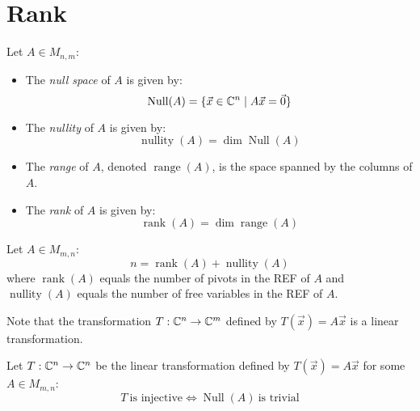 \documentclass[letterpaper,12pt,fleqn]{article}
\newcommand{\vx}{\vec{x}}
\newcommand{\vz}{\vec{0}}
\DeclareMathOperator{\Null}{Null}
\DeclareMathOperator{\nullity}{nullity}
\DeclareMathOperator{\range}{range}
\DeclareMathOperator{\rnk}{rank}
\begin{document}
\section*{Rank}

\begin{definition}
  Let $A\in M_{n,m}$:
  \begin{itemize}
  \item The \emph{null space} of $A$ is given by:
    \[\Null(A)=\{\vx\in\C^n\mid A\vx=\vz\}\]

  \item The \emph{nullity} of $A$ is given by:
    \[\nullity(A)=\dim\Null(A)\]

  \item The \emph{range} of $A$, denoted $\range(A)$, is the space spanned by
    the columns of $A$.

  \item The \emph{rank} of $A$ is given by:
    \[\rnk(A)=\dim\range(A)\]
  \end{itemize}
\end{definition}

\begin{theorem}
  Let $A\in M_{m,n}$:
  \[n=\rnk(A)+\nullity(A)\]
  where $\rnk(A)$ equals the number of pivots in the REF of $A$ and
  $\nullity(A)$ equals the number of free variables in the REF of $A$.
\end{theorem}

Note that the transformation $T:\mathbb{C}^n\to\mathbb{C}^m$ defined by $T(\vx)=A\vx$ is a
linear transformation.

\begin{theorem}
  Let $T:\mathbb{C}^n\to\mathbb{C}^n$ be the linear transformation defined by $T(\vx)=A\vx$ for
  some $A\in M_{m,n}$:
  \[T\ \mbox{is injective} \iff \Null(A)\ \mbox{is trivial}\]
\end{theorem}
\end{document}
